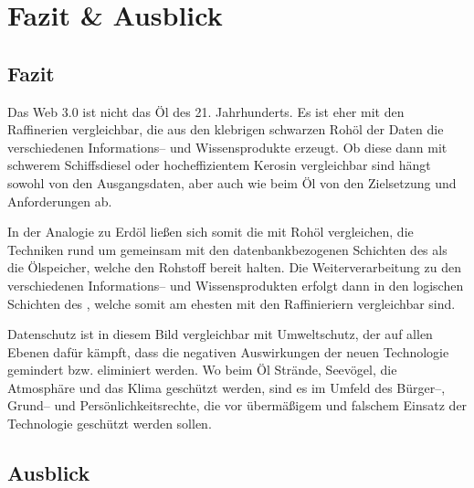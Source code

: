 \section{Fazit \& Ausblick}

\subsection{Fazit}


Das Web 3.0 ist nicht das Öl des 21. Jahrhunderts. Es ist eher mit den Raffinerien vergleichbar, die aus den klebrigen schwarzen Rohöl der Daten die verschiedenen Informations-- und Wissensprodukte erzeugt. Ob diese dann mit schwerem Schiffsdiesel oder hocheffizientem Kerosin vergleichbar sind hängt sowohl von den Ausgangsdaten, aber auch wie beim Öl von den Zielsetzung und Anforderungen ab.

In der Analogie zu Erdöl ließen sich somit die  mit Rohöl vergleichen, die Techniken rund um  gemeinsam mit den datenbankbezogenen Schichten des  als die Ölspeicher, welche den Rohstoff bereit halten. Die Weiterverarbeitung zu den verschiedenen Informations-- und Wissensprodukten erfolgt dann in den logischen Schichten des , welche somit am ehesten mit den Raffinieriern vergleichbar sind.

Datenschutz ist in diesem Bild vergleichbar mit Umweltschutz, der auf allen Ebenen dafür kämpft, dass die negativen Auswirkungen der neuen Technologie gemindert bzw. eliminiert werden. Wo beim Öl Strände, Seevögel, die Atmosphäre und das Klima geschützt werden, sind es  im Umfeld des  Bürger--, Grund-- und Persönlichkeitsrechte, die vor übermäßigem und falschem Einsatz der Technologie geschützt werden sollen.

\subsection{Ausblick}

